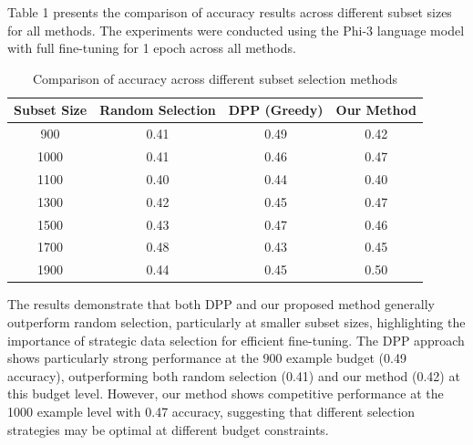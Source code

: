 \documentclass{article}
\begin{document}
Table 1 presents the comparison of accuracy results across different subset sizes for all methods. The experiments were conducted using the Phi-3 language model with full fine-tuning for 1 epoch across all methods.
\begin{table}[h]
\centering
\begin{tabular}{|c|c|c|c|}
\hline
\textbf{Subset Size} & \textbf{Random Selection} & \textbf{DPP (Greedy)} & \textbf{Our Method} \\
\hline
900 & 0.41 & 0.49 & 0.42 \\
\hline
1000 & 0.41 & 0.46 & 0.47 \\
\hline
1100 & 0.40 & 0.44 & 0.40 \\
\hline
1300 & 0.42 & 0.45 & 0.47 \\
\hline
1500 & 0.43 & 0.47 & 0.46 \\
\hline
1700 & 0.48 & 0.43 & 0.45 \\
\hline
1900 & 0.44 & 0.45 & 0.50 \\
\hline
\end{tabular} 
\vspace{0.5em}
\caption{Comparison of accuracy across different subset selection methods}
\end{table}

The results demonstrate that both DPP and our proposed method generally outperform random selection, particularly at smaller subset sizes, highlighting the importance of strategic data selection for efficient fine-tuning. The DPP approach shows particularly strong performance at the 900 example budget (0.49 accuracy), outperforming both random selection (0.41) and our method (0.42) at this budget level. However, our method shows competitive performance at the 1000 example level with 0.47 accuracy, suggesting that different selection strategies may be optimal at different budget constraints.


\end{document}
